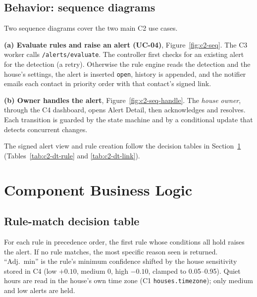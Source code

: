 \subsection{Behavior: sequence diagrams}
Two sequence diagrams cover the two main C2 use cases.

\textbf{(a) Evaluate rules and raise an alert (UC-04)}, Figure~\ref{fig:c2-seq}. The C3 worker calls
\texttt{/alerts/evaluate}. The controller first checks for an existing alert for the detection (a retry). Otherwise
the rule engine reads the detection and the house's settings, the alert is inserted \texttt{open}, history is appended,
and the notifier emails each contact in priority order with that contact's signed link.


\textbf{(b) Owner handles the alert}, Figure~\ref{fig:c2-seq-handle}. The \emph{house owner}, through the C4
dashboard, opens Alert Detail, then acknowledges and resolves. Each transition is guarded by the state machine and
by a conditional update that detects concurrent changes.


The signed alert view and rule creation follow the decision tables in Section~\ref{sec:c2-bl}
(Tables~\ref{tab:c2-dt-rule} and \ref{tab:c2-dt-link}).

\section{Component Business Logic}\label{sec:c2-bl}

\subsection{Rule-match decision table}
For each rule in precedence order, the first rule whose conditions all hold raises the alert. If no rule
matches, the most specific reason seen is returned. ``Adj.\ min'' is the rule's minimum confidence shifted by the
house sensitivity stored in C4 (low $+0.10$, medium $0$, high $-0.10$, clamped to 0.05--0.95). Quiet hours are read in
the house's own time zone (C1 \texttt{houses.timezone}); only medium and low alerts are held.

